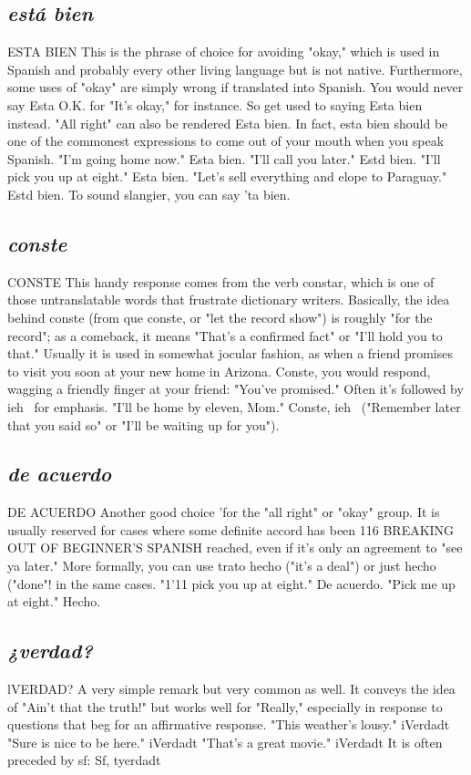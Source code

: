 \subsection{\emph{está bien}}
ESTA BIEN
This is the phrase of choice for avoiding "okay," which is used
in Spanish and probably every other living language but is not native.
Furthermore, some uses of "okay" are simply wrong if translated into
Spanish. You would never say Esta O.K. for "It's okay," for instance. So
get used to saying Esta bien instead. "All right" can also be rendered
Esta bien. In fact, esta bien should be one of the commonest expressions to come out of your mouth when you speak Spanish. "I'm going
home now." Esta bien. "I'll call you later." Estd bien. "I'll pick you up
at eight." Esta bien. "Let's sell everything and elope to Paraguay." Estd
bien. To sound slangier, you can say 'ta bien.
\subsection{\emph{conste}}
CONSTE
This handy response comes from the verb constar, which is
one of those untranslatable words that frustrate dictionary writers.
Basically, the idea behind conste (from que conste, or "let the record
show") is roughly "for the record"; as a comeback, it means "That's a
confirmed fact" or "I'll hold you to that." Usually it is used in somewhat jocular fashion, as when a friend promises to visit you soon at
your new home in Arizona. Conste, you would respond, wagging a
friendly finger at your friend: "You've promised." Often it's followed
by ieh~ for emphasis. "I'll be home by eleven, Mom." Conste, ieh~
("Remember later that you said so" or "I'll be waiting up for you").
\subsection{\emph{de acuerdo}}
DE ACUERDO
Another good choice 'for the "all right" or "okay" group. It
is usually reserved for cases where some definite accord has been
116 BREAKING OUT OF BEGINNER'S SPANISH
reached, even if it's only an agreement to "see ya later." More formally,
you can use trato hecho ("it's a deal") or just hecho ("done"! in the
same cases. "1'11 pick you up at eight." De acuerdo. "Pick me up at
eight." Hecho.
\subsection{\emph{¿verdad?}}
lVERDAD?
A very simple remark but very common as well. It conveys the
idea of "Ain't that the truth!" but works well for "Really," especially
in response to questions that beg for an affirmative response. "This
weather's lousy." iVerdadt "Sure is nice to be here." iVerdadt "That's
a great movie." iVerdadt It is often preceded by sf: Sf, tyerdadt

